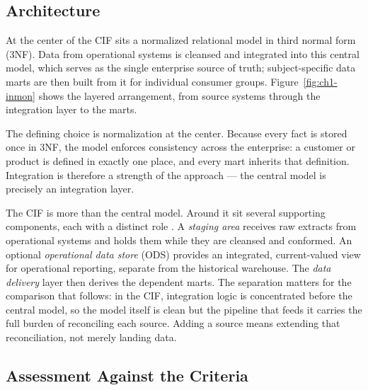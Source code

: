 \subsection{Architecture}
\label{subsec:ch1-inmon-arch}

At the center of the CIF sits a normalized relational model in third normal form (3NF). Data from operational systems is cleansed and integrated into this central model, which serves as the single enterprise source of truth; subject-specific data marts are then built from it for individual consumer groups. Figure~\ref{fig:ch1-inmon} shows the layered arrangement, from source systems through the integration layer to the marts.


The defining choice is normalization at the center. Because every fact is stored once in 3NF, the model enforces consistency across the enterprise: a customer or product is defined in exactly one place, and every mart inherits that definition. Integration is therefore a strength of the approach --- the central model is precisely an integration layer.

The CIF is more than the central model. Around it sit several supporting components, each with a distinct role \parencite{inmon2005}. A \textit{staging area} receives raw extracts from operational systems and holds them while they are cleansed and conformed. An optional \textit{operational data store} (ODS) provides an integrated, current-valued view for operational reporting, separate from the historical warehouse. The \textit{data delivery} layer then derives the dependent marts. The separation matters for the comparison that follows: in the CIF, integration logic is concentrated before the central model, so the model itself is clean but the pipeline that feeds it carries the full burden of reconciling each source. Adding a source means extending that reconciliation, not merely landing data.

\subsection{Assessment Against the Criteria}
\label{subsec:ch1-inmon-assess}

